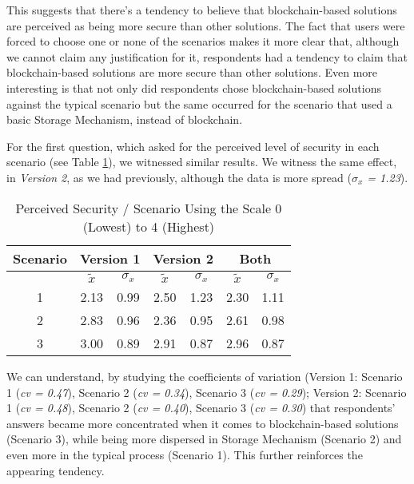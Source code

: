 This suggests that there's a tendency to believe that blockchain-based solutions are perceived as being more secure than other solutions. The fact that users were forced to choose one or none of the scenarios makes it more clear that, although we cannot claim any justification for it, respondents had a tendency to claim that blockchain-based solutions are more secure than other solutions. Even more interesting is that not only did respondents chose blockchain-based solutions against the typical scenario but the same occurred for the scenario that used a basic Storage Mechanism, instead of blockchain.

For the first question, which asked for the perceived level of security in each scenario (see Table \ref{tab: perceivedSecurity}), we witnessed similar results. We witness the same effect, in \textit{Version 2}, as we had previously, although the data is more spread (\textit{$\sigma_{x}$ = 1.23}).

\begin{table}[htb]
    \centering
    \caption{Perceived Security / Scenario Using the Scale 0 (Lowest) to 4 (Highest)}
    \label{tab: perceivedSecurity}
    \begin{tabular}{c|cccc|cc}
    \hline 
    Scenario & \multicolumn{2}{c}{\bf Version 1} & \multicolumn{2}{c}{\bf Version 2} \vrule & \multicolumn{2}{c}{\bf Both} \\
    \hline
     & $\tilde{x}$ & $\sigma_{x}$ & $\tilde{x}$ & $\sigma_{x}$ & $\tilde{x}$ & $\sigma_{x}$ \\
    \hline
    1 & 2.13 & 0.99 & 2.50 & 1.23 & 2.30 & 1.11 \\
    2 & 2.83 & 0.96 & 2.36 & 0.95 & 2.61 & 0.98 \\
    3 & 3.00 & 0.89 & 2.91 & 0.87 & 2.96 & 0.87 \\
    \hline
    \end{tabular}
\end{table}

We can understand, by studying the coefficients of variation (Version 1: Scenario 1 (\textit{cv = 0.47}), Scenario 2 (\textit{cv = 0.34}), Scenario 3 (\textit{cv = 0.29}); Version 2: Scenario 1 (\textit{cv = 0.48}), Scenario 2 (\textit{cv = 0.40}), Scenario 3 (\textit{cv = 0.30}) that respondents' answers became more concentrated when it comes to blockchain-based solutions (Scenario 3), while being more dispersed in Storage Mechanism (Scenario 2) and even more in the typical process (Scenario 1). This further reinforces the appearing tendency.

